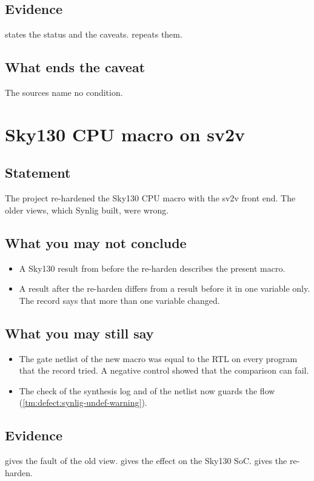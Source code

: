 \subsection*{Evidence}
 states the status and the caveats.  repeats them.

\subsection*{What ends the caveat}
The sources name no condition.

\section{Sky130 CPU macro on sv2v}\label{tm:caveat:sky130-cpu-macro-sv2v}
\subsection*{Statement}
The project re-hardened the Sky130 CPU macro with the sv2v front end. The older views, which Synlig built, were wrong.

\subsection*{What you may not conclude}
\begin{itemize}
  \item A Sky130 result from before the re-harden describes the present macro.
  \item A result after the re-harden differs from a result before it in one variable only. The record says that more than one variable changed.
\end{itemize}

\subsection*{What you may still say}
\begin{itemize}
  \item The gate netlist of the new macro was equal to the RTL on every program that the record tried. A negative control showed that the comparison can fail.
  \item The check of the synthesis log and of the netlist now guards the flow (\cref{tm:defect:synlig-undef-warning}).
\end{itemize}

\subsection*{Evidence}
 gives the fault of the old view.  gives the effect on the Sky130 SoC.  gives the re-harden.

